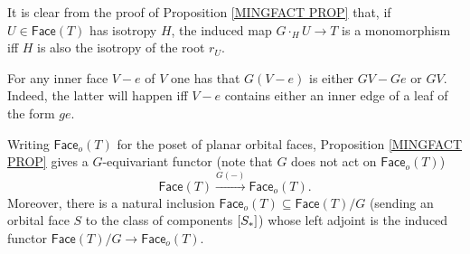 \documentclass[a4paper,10pt
,draft
]{article}%
\begin{document}
\begin{remark}
	It is clear from the proof of 
	Proposition \ref{MINGFACT PROP}
	that, if $U \in \mathsf{Face}(T)$ has isotropy $H$,
	the induced map 
	$G \cdot_H U \to T$ is a monomorphism iff
	$H$ is also the isotropy of the root $r_U$.
\end{remark}

\begin{remark}\label{GINNER REM}
	For any inner face $V-e$ of $V$ one has 
	that $G(V-e)$ is either $GV - Ge$ or $GV$.
	Indeed, the latter will happen iff $V-e$ contains either an inner edge of a leaf of the form $ge$.
\end{remark}

\begin{remark}
	Writing $\mathsf{Face}_o(T)$ for the poset of planar orbital faces, Proposition \ref{MINGFACT PROP} gives a $G$-equivariant functor (note that $G$ does not act on $\mathsf{Face}_o(T)$)
\[
	\mathsf{Face}(T) \xrightarrow{G(-)} \mathsf{Face}_o(T).
\]
Moreover, there is a natural inclusion
$\mathsf{Face}_o(T) \subseteq \mathsf{Face}(T)/G$ (sending an orbital face $S$ to the class of components $[S_{\**}]$)
whose left adjoint is the induced functor 
$\mathsf{Face}(T)/G \to \mathsf{Face}_o(T)$.
\end{remark}
\end{document}
